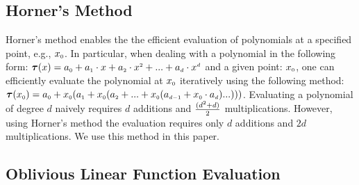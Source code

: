 

\vspace{-3.5mm}

\subsection{Horner's Method}
\vspace{-1mm}

Horner's method \cite{DBLP:journals/ibmrd/Dorn62} enables the the efficient evaluation of polynomials at a specified point, e.g., $x_{\scriptscriptstyle 0}$. In particular, when dealing with a polynomial in the following form: $\bm\tau(x)= a_{\scriptscriptstyle 0}+a_{\scriptscriptstyle 1}\cdot x+a_{\scriptscriptstyle 2}\cdot x^{\scriptscriptstyle 2}+...+a_{\scriptscriptstyle d}\cdot x^{\scriptscriptstyle d}$ and a given point: $x_{\scriptscriptstyle 0}$, one can efficiently evaluate the polynomial at $x_{\scriptscriptstyle 0}$ iteratively using  the following method: $\bm\tau(x_{\scriptscriptstyle 0})=a_{\scriptscriptstyle 0}+x_{\scriptscriptstyle 0}(a_{\scriptscriptstyle 1} + x_{\scriptscriptstyle 0}(a_{\scriptscriptstyle 2}+...+x_{\scriptscriptstyle 0}(a_{\scriptscriptstyle d-1}+x_{\scriptscriptstyle 0}\cdot a_{\scriptscriptstyle d})...)))$. Evaluating  a polynomial of degree $d$ naively requires  $d$ additions and $\frac{(d^{\scriptscriptstyle 2}+d)}{2}$ multiplications. However, using Horner's method the evaluation requires only $d$ additions and $2d$ multiplications. We use this method in this paper. 

\vspace{-3.4mm}

\subsection{Oblivious Linear Function Evaluation}\label{sec::OLE-plus}
\vspace{-1mm}

